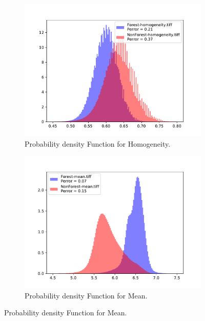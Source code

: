 \begin{figure}[H]\ContinuedFloat
    \centering
    \begin{subfigure}[b]{0.4\linewidth}
        \includegraphics[width=\linewidth]{Chapter5/SENTINEL1/Sigma0/homogeneity_histogram.pdf}
        \caption{Probability density Function for Homogeneity.}
    \end{subfigure}
  
  \centering
  \begin{subfigure}[b]{0.4\linewidth}
    \includegraphics[width=\linewidth]{Chapter5/SENTINEL1/Sigma0/mean_histogram.pdf}
    \caption{Probability density Function for Mean.}
  \end{subfigure}
  \centering


\end{figure}
